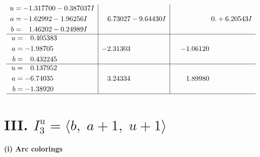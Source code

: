 \documentclass[1p]{elsarticle_modified}
\theoremstyle{definition}
\begin{document}
$$\begin{array}{c|c|c}
\begin{aligned}
u &= -1.317700 - 0.387037 I \\
a &= -1.62992 - 1.96256 I \\
b &= \phantom{-}1.46202 - 0.24989 I\end{aligned}
 & \phantom{-}6.73027 - 9.64430 I & \phantom{-0.000000 -}0. + 6.20543 I \\ \hline\begin{aligned}
u &= \phantom{-}0.405383\phantom{ +0.000000I} \\
a &= -1.98705\phantom{ +0.000000I} \\
b &= \phantom{-}0.432245\phantom{ +0.000000I}\end{aligned}
 & -2.31303\phantom{ +0.000000I} & -1.06120\phantom{ +0.000000I} \\ \hline\begin{aligned}
u &= \phantom{-}0.137952\phantom{ +0.000000I} \\
a &= -6.74035\phantom{ +0.000000I} \\
b &= -1.38920\phantom{ +0.000000I}\end{aligned}
 & \phantom{-}3.24334\phantom{ +0.000000I} & \phantom{-}1.89980\phantom{ +0.000000I}\\
 \hline 
 \end{array}$$\newpage\newpage\renewcommand{\arraystretch}{1}
\centering \section*{III. $I^u_{3}= \langle b,\;a+1,\;u+1 \rangle$}
\flushleft \textbf{(i) Arc colorings}\\
\end{document}
